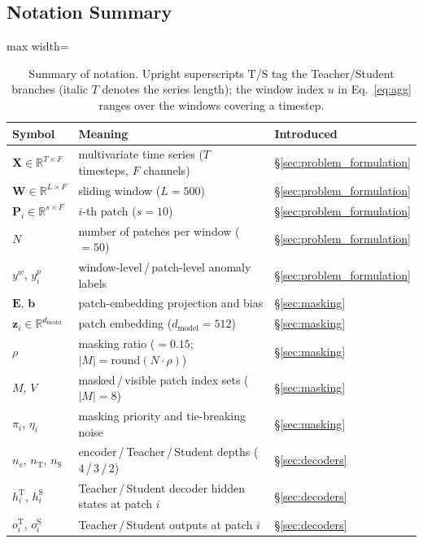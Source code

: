 \subsection{Notation Summary}
\label{sec:appendix_notation}

\begin{table}[tp]
\footnotesize
\centering
\caption{Summary of notation. Upright superscripts $\mathrm{T}$/$\mathrm{S}$ tag the
  Teacher/Student branches (italic $T$ denotes the series length); the window index $u$ in
  Eq.~\ref{eq:agg} ranges over the windows covering a timestep.}
\label{tab:notation}
\begin{adjustbox}{max width=\linewidth}
\begin{tabular}{lll}
\toprule
Symbol & Meaning & Introduced \\
\midrule
$\mathbf{X} \in \mathbb{R}^{T \times F}$ & multivariate time series ($T$ timesteps, $F$ channels) & \S\ref{sec:problem_formulation} \\
$\mathbf{W} \in \mathbb{R}^{L \times F}$ & sliding window ($L = 500$) & \S\ref{sec:problem_formulation} \\
$\mathbf{P}_i \in \mathbb{R}^{s \times F}$ & $i$-th patch ($s = 10$) & \S\ref{sec:problem_formulation} \\
$N$ & number of patches per window ($= 50$) & \S\ref{sec:problem_formulation} \\
$y^w$, $y^p_i$ & window-level\,/\,patch-level anomaly labels & \S\ref{sec:problem_formulation} \\
$\mathbf{E}$, $\mathbf{b}$ & patch-embedding projection and bias & \S\ref{sec:masking} \\
$\mathbf{z}_i \in \mathbb{R}^{d_{\mathrm{model}}}$ & patch embedding ($d_{\mathrm{model}} = 512$) & \S\ref{sec:masking} \\
$\rho$ & masking ratio ($= 0.15$; $|M| = \mathrm{round}(N \cdot \rho)$) & \S\ref{sec:masking} \\
$M$, $V$ & masked\,/\,visible patch index sets ($|M| = 8$) & \S\ref{sec:masking} \\
$\pi_i$, $\eta_i$ & masking priority and tie-breaking noise & \S\ref{sec:masking} \\
$n_e$, $n_{\mathrm{T}}$, $n_{\mathrm{S}}$ & encoder\,/\,Teacher\,/\,Student depths ($4$\,/\,$3$\,/\,$2$) & \S\ref{sec:decoders} \\
$h^{\mathrm{T}}_i$, $h^{\mathrm{S}}_i$ & Teacher\,/\,Student decoder hidden states at patch $i$ & \S\ref{sec:decoders} \\
$o^{\mathrm{T}}_i$, $o^{\mathrm{S}}_i$ & Teacher\,/\,Student outputs at patch $i$ & \S\ref{sec:decoders} \\

\end{tabular}
\end{adjustbox}
\end{table}
